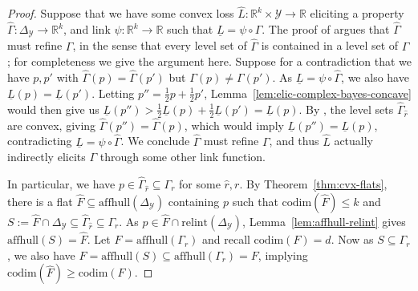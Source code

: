 \documentclass[anon,12pt]{colt2021} %
\newcommand{\reals}{\mathbb{R}}
\newcommand{\simplex}{\Delta_\Y}
\newcommand{\relint}[1]{\mathrm{relint}(#1)}
\newcommand{\codim}{\mathrm{codim}}
\newcommand{\affhull}{\mathrm{affhull}}
\newcommand{\Y}{\mathcal{Y}}
\newcommand{\lbar}{\underline{L}} %
\newcommand{\iden}{\mathrm{iden}}
\begin{document}
\bayesrisklowerbound*
\begin{proof}
	Suppose that we have some convex loss $\hat L:\reals^k\times\Y\to\reals$ eliciting a property $\hat\Gamma:\simplex\to\reals^k$, and link $\psi : \reals^k \to \reals$ such that $\lbar = \psi \circ \hat\Gamma$.
	The proof of \citet[Theorem 4]{frongillo2018elicitation} argues that $\hat\Gamma$ must refine $\Gamma$, in the sense that every level set of $\hat\Gamma$ is contained in a level set of $\Gamma$; for completeness we give the argument here.
	Suppose for a contradiction that we have $p,p'$ with $\hat\Gamma(p)=\hat\Gamma(p')$ but $\Gamma(p) \neq \Gamma(p')$.
	As $\lbar = \psi \circ \hat\Gamma$, we also have $\lbar(p) = \lbar(p')$.
	Letting $p'' = \tfrac 1 2 p +  \tfrac 1 2 p'$, Lemma~\ref{lem:elic-complex-bayes-concave} would then give us $\lbar(p'') >  \tfrac 1 2 \lbar(p) +  \tfrac 1 2 \lbar(p') = \lbar(p)$.
	By \citet{osband1985providing}, the level sets $\hat\Gamma_{\hat r}$ are convex, giving $\hat\Gamma(p'') = \hat\Gamma(p)$, which would imply $\lbar(p'')=\lbar(p)$, contradicting $\lbar = \psi \circ \hat\Gamma$.
	We conclude $\hat\Gamma$ must refine $\Gamma$, and thus $\hat L$ actually indirectly elicits $\Gamma$ through some other link function.
	
	In particular, we have $p \in \hat \Gamma_{\hat r} \subseteq \Gamma_r$ for some $\hat r, r$.
	By Theorem~\ref{thm:cvx-flats}, there is a flat $\hat F \subseteq \affhull(\simplex)$ containing $p$ such that $\codim(\hat F) \leq k$ and $S := \hat F \cap \simplex \subseteq \hat\Gamma_{\hat r} \subseteq \Gamma_r$.
	As $p\in \hat F\cap\relint\simplex$, Lemma~\ref{lem:affhull-relint} gives $\affhull(S) = \hat F$.
	Let $F = \affhull(\Gamma_r)$ and recall $\codim(F)=d$.
	Now as $S \subseteq \Gamma_r$, we also have $\hat F = \affhull(S) \subseteq \affhull(\Gamma_r) = F$,
	implying $\codim(\hat F) \geq \codim(F)$.
	

\end{proof}
\end{document}
